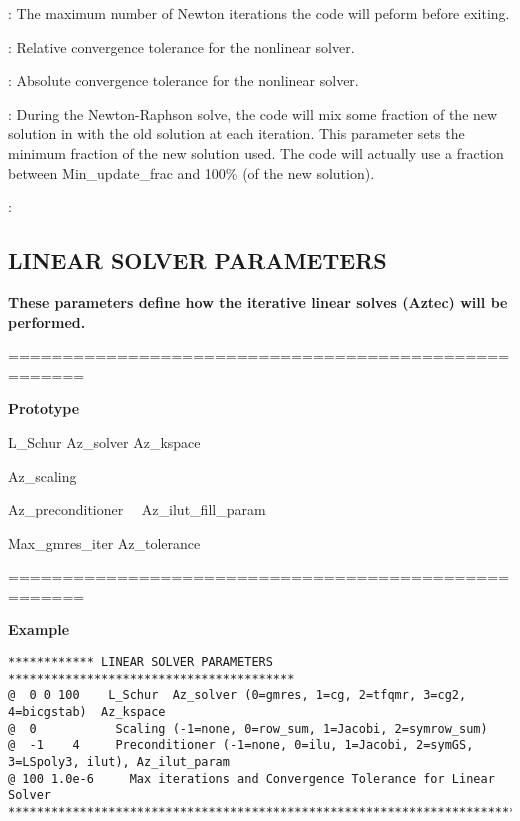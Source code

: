\documentclass[10pt,onecolumn]{article}
\begin{document}
\vspace{0.1in}
:  The maximum number of Newton iterations the code will peform before exiting.

\vspace{0.1in}
:
Relative convergence tolerance for the nonlinear solver.

\vspace{0.1in}
:
Absolute convergence tolerance for the nonlinear solver.

\vspace{0.1in}
:  During the Newton-Raphson solve, the code will mix some fraction of the new solution in with the old solution at each iteration.  This parameter sets the minimum fraction of the new solution used.  The code will actually use a fraction between Min\_update\_frac and 100\% (of the new solution).

\vspace{0.1in}
:

\vfill
\break

\subsection{LINEAR SOLVER PARAMETERS}
{\bf  These parameters define
how the iterative linear solves (Aztec) will be performed.}

\noindent=====================================================

{\bf Prototype}

{\it

L\_Schur Az\_solver  Az\_kspace

Az\_scaling

Az\_preconditioner \ \ Az\_ilut\_fill\_param

Max\_gmres\_iter   Az\_tolerance

}

\noindent=====================================================

{\bf Example}

\begin{verbatim}
************ LINEAR SOLVER PARAMETERS ****************************************
@  0 0 100    L_Schur  Az_solver (0=gmres, 1=cg, 2=tfqmr, 3=cg2, 4=bicgstab)  Az_kspace
@  0           Scaling (-1=none, 0=row_sum, 1=Jacobi, 2=symrow_sum)
@  -1    4     Preconditioner (-1=none, 0=ilu, 1=Jacobi, 2=symGS, 3=LSpoly3, ilut), Az_ilut_param
@ 100 1.0e-6     Max iterations and Convergence Tolerance for Linear Solver
***********************************************************************
\end{verbatim}
\end{document}
